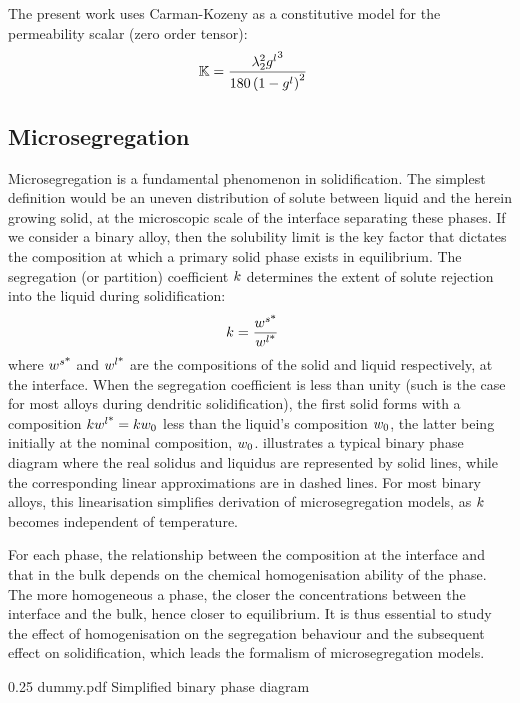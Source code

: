 The present work uses Carman-Kozeny as a constitutive model for the permeability scalar (zero order tensor):
\begin{align}
\label{eq:permeability}
& \mathbb{K}  = \frac{{\lambda}_{2}^2 {g^l}^3}{180\left( 1-{g^l} \right)^2}
\end{align}
\subsection{Microsegregation}
Microsegregation is a fundamental phenomenon in solidification. The simplest definition would be 
an uneven distribution of solute between liquid and the herein growing solid, at the microscopic scale
of the interface separating these phases. If we consider a binary alloy, then the solubility limit is 
the key factor that dictates the composition at which a primary solid phase exists in equilibrium. 
The segregation (or partition) coefficient $k$ determines the extent of solute rejection into the liquid during solidification:
\begin{align}
\label{eq:partition}
& k = \frac{{w}^{s \text{*}} }{{w}^{l \text{*}} }
\end{align}
where ${w}^{s \text{*}} $ and ${w}^{l \text{*}} $ are the compositions of the solid and liquid respectively, at the interface. When the 
segregation coefficient is less than unity (such is the case for most alloys during dendritic solidification), 
the first solid forms with a composition $k {w}^{l \text{*}} =k {w}_0$ less than the liquid's 
composition ${w}_0$, the latter being initially at the nominal composition, ${w}_0$.  illustrates a typical binary 
phase diagram where the real solidus and liquidus are represented by solid lines, while the corresponding linear approximations are in dashed lines.
For most binary alloys, this linearisation simplifies derivation of microsegregation models, as $k$ becomes independent of temperature.

For each phase, the relationship between the composition at the interface and that in the bulk depends on the chemical homogenisation ability of the phase.
The more homogeneous a phase, the closer the concentrations between the interface and the bulk, hence closer to equilibrium.
It is thus essential to study the effect of homogenisation on the segregation behaviour and the subsequent effect on solidification, which leads the formalism of microsegregation models.
\begin{figureth}
{0.25}
{dummy.pdf}
{Simplified binary phase diagram}
\label{fig:binary_diag}
\end{figureth}
